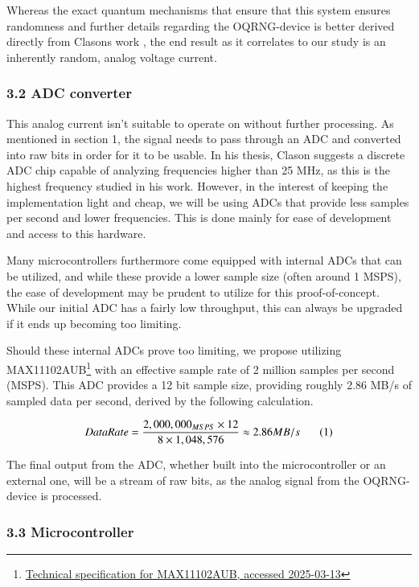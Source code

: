 \documentclass{sigchi}
\begin{document}
Whereas the exact quantum mechanisms that ensure that this system ensures randomness and further details regarding the OQRNG-device is better derived directly from Clasons work \cite{Clason2023}, the end result as it correlates to our study is an inherently random, analog voltage current.

\subsubsection{3.2 ADC converter}\label{adc-converter}

This analog current isn't suitable to operate on without further processing. As mentioned in section 1, the signal needs to pass through an ADC and converted into raw bits in order for it to be usable. In his thesis, Clason \cite{Clason2023} suggests a discrete ADC chip capable of analyzing frequencies higher than 25 MHz, as this is the highest frequency studied in his work. However, in the interest of keeping the implementation light and cheap, we will be using ADCs that provide less samples per second and lower frequencies. This is done mainly for ease of development and access to this hardware.

Many microcontrollers furthermore come equipped with internal ADCs that can be utilized, and while these provide a lower sample size (often around 1 MSPS), the ease of development may be prudent to utilize for this proof-of-concept. While our initial ADC has a fairly low throughput, this can always be upgraded if it ends up becoming too limiting.

Should these internal ADCs prove too limiting, we propose utilizing MAX11102AUB\footnote{\href{https://www.farnell.com/datasheets/1913106.pdf}{Technical specification for MAX11102AUB, accessed 2025-03-13}} with an effective sample rate of 2 million samples per second (MSPS). This ADC provides a 12 bit sample size, providing roughly 2.86 MB/s of sampled data per second, derived by the following calculation.

\[
Data Rate = \frac{2,000,000_{MSPS} \times 12}{8 \times 1,048,576} \approx 2.86 MB/s \text{\phantom{123} (1)}
\]

The final output from the ADC, whether built into the microcontroller or an external one, will be a stream of raw bits, as the analog signal from the OQRNG-device is processed.

\subsubsection{3.3 Microcontroller}\label{microcontroller}
\end{document}
